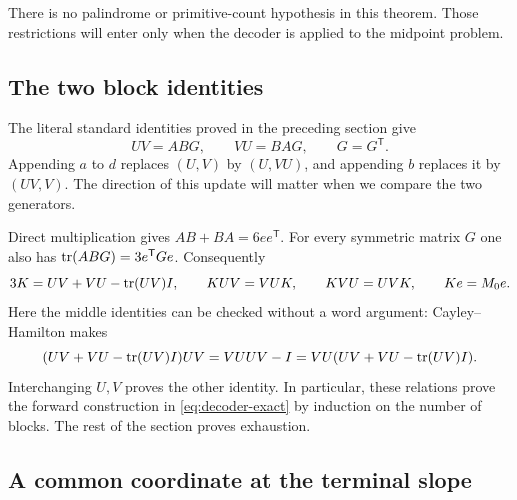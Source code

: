 There is no palindrome or primitive-count hypothesis in this theorem.
Those restrictions will enter only when the decoder is applied to the
midpoint problem.

\subsection{The two block identities}

The literal standard identities proved in the preceding section give
\begin{equation}\label{eq:decoder-standard}
 UV=ABG,\qquad VU=BAG,\qquad G=G^{\mathsf T}.
\end{equation}
Appending $a$ to $d$ replaces $(U,V)$ by $(U,VU)$, and appending
$b$ replaces it by $(UV,V)$. The direction of this update will matter
when we compare the two generators.

Direct multiplication gives $AB+BA=6ee^{\mathsf T}$. For every
symmetric matrix $G$ one also has
$\operatorname{tr}(ABG)=3e^{\mathsf T}Ge$. Consequently
\begin{equation}\label{eq:decoder-intertwiners}
 3K=UV+VU-\operatorname{tr}(UV)I,\qquad
 KUV=VUK,\qquad KVU=UVK,\qquad Ke=M_0e.
\end{equation}
Here the middle identities can be checked without a word argument:
Cayley--Hamilton makes
$$
 (UV+VU-\operatorname{tr}(UV)I)UV
 =VUUV-I
 =VU(UV+VU-\operatorname{tr}(UV)I).
$$
Interchanging $U,V$ proves the other identity. In particular, these
relations prove the forward construction in
\eqref{eq:decoder-exact} by induction on the number of blocks. The
rest of the section proves exhaustion.

\subsection{A common coordinate at the terminal slope}

